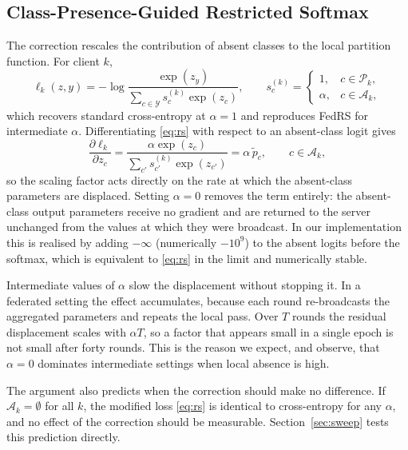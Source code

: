\documentclass[journal]{IEEEtran}
\begin{document}
\subsection{Class-Presence-Guided Restricted Softmax}
The correction rescales the contribution of absent classes to the local
partition function. For client $k$,
\begin{equation}
\ell_k(z,y) = -\log
\frac{\exp(z_y)}{\displaystyle\sum_{c \in \mathcal{Y}} s_c^{(k)} \exp(z_c)},
\qquad
s_c^{(k)} =
\begin{cases}
1, & c \in \mathcal{P}_k,\\[2pt]
\alpha, & c \in \mathcal{A}_k,
\end{cases}
\label{eq:rs}
\end{equation}
which recovers standard cross-entropy at $\alpha = 1$ and reproduces FedRS
\cite{fedrs2021} for intermediate $\alpha$. Differentiating \eqref{eq:rs} with
respect to an absent-class logit gives
\begin{equation}
\frac{\partial \ell_k}{\partial z_c}
= \frac{\alpha \exp(z_c)}{\sum_{c'} s_{c'}^{(k)}\exp(z_{c'})}
= \alpha\, \tilde{p}_c , \qquad c \in \mathcal{A}_k ,
\label{eq:grad_alpha}
\end{equation}
so the scaling factor acts directly on the rate at which the absent-class
parameters are displaced. Setting $\alpha = 0$ removes the term entirely: the
absent-class output parameters receive no gradient and are returned to the
server unchanged from the values at which they were broadcast. In our
implementation this is realised by adding $-\infty$ (numerically $-10^{9}$) to
the absent logits before the softmax, which is equivalent to \eqref{eq:rs} in the
limit and numerically stable.

Intermediate values of $\alpha$ slow the displacement without stopping it. In a
federated setting the effect accumulates, because each round re-broadcasts the
aggregated parameters and repeats the local pass. Over $T$ rounds the residual
displacement scales with $\alpha T$, so a factor that appears small in a single
epoch is not small after forty rounds. This is the reason we expect, and
observe, that $\alpha = 0$ dominates intermediate settings when local absence is
high.

The argument also predicts when the correction should make no difference. If
$\mathcal{A}_k = \emptyset$ for all $k$, the modified loss \eqref{eq:rs} is
identical to cross-entropy for any $\alpha$, and no effect of the correction
should be measurable. Section~\ref{sec:sweep} tests this prediction directly.
\end{document}
